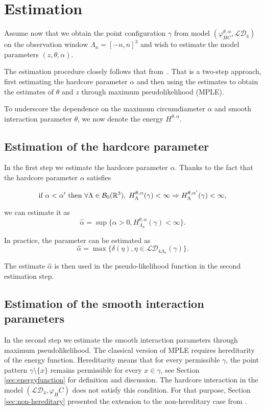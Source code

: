 \chapter{Estimation}
Assume now that we obtain the point configuration $\gamma$ from model $(\varphi^{\theta,\alpha}_{HC},\mathcal {LD}_4)$ on the observation window $\Lambda_n = [-n,n]^3$ and wish to estimate the model parameters $(z,\theta,\alpha)$.  

The estimation procedure closely follows that from~\cite{DereudreLavancier2010}. That is a two-step approach, first estimating the hardcore parameter $\alpha$ and then using the estimates to obtain the estimates of $\theta$ and $z$ through maximum pseudolikelihood (MPLE). 

To underscore the dependence on the maximum circumdiameter $\alpha$ and smooth interaction parameter $\theta$, we now denote the energy $H^{\theta,\alpha}$.
\section{Estimation of the hardcore parameter}
In the first step we estimate the hardcore parameter $\alpha$. 
 Thanks to the fact that the hardcore parameter $\alpha$ satisfies

 $$ \text{if } \alpha < \alpha' \text{ then  } \forall \Lambda \in \mathcal B_0({\mathbb R^3}), \; H^{\theta,\alpha}_\Lambda(\gamma) < \infty \Rightarrow  H^{\theta,\alpha'}_\Lambda(\gamma)<\infty,$$ 

we can estimate it as
$$\hat\alpha = \sup\{\alpha > 0, H^{\theta,\alpha}_{\Lambda_n}(\gamma) < \infty \}.$$

In practice, the parameter can be estimated as
$$\hat\alpha = \max\{\delta(\eta), \eta\in \mathcal {LD}_{4\Lambda_n}(\gamma)\}.$$

The estimate $\hat\alpha$ is then used in the pseudo-likelihood function in the second estimation step.


\section{Estimation of the smooth interaction parameters}
In the second step we estimate the smooth interaction parameters through maximum pseudolikelihood.
The classical version of MPLE requires hereditarity of the energy function. Hereditarity means that for every permissible $\gamma$, the point pattern $\gamma\setminus\{x\}$ remains permissible for every $x\in\gamma$, see Section \ref{sec:energyfunction} for definition and discussion. The hardcore interaction in the model $(\mathcal {LD}_4,\varphi_HC)$ does not satisfy this condition. For that purpose, Section \ref{sec:non-hereditary} presented the extension to the non-hereditary case from \cite{DereudreLavancier2007}. 

